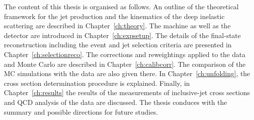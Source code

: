 The content of this thesis is organised as follows. An outline of the theoretical framework for the jet production and the kinematics of the deep inelastic scattering are described in Chapter~\ref{ch:theory}. The \hera machine as well as the \zeus detector are introduced in Chapter~\ref{ch:expsetup}. The details of the final-state reconstruction including the event and jet selection criteria are presented in Chapter~\ref{ch:selectionreco}. The corrections and reweightings applied to the data and Monte Carlo are described in Chapter~\ref{ch:calibcorr}. The comparison of the MC simulations with the data are also given there. In Chapter~\ref{ch:unfolding}, the cross section determination procedure is explained. Finally, in Chapter~\ref{ch:results} the results of the measurements of inclusive-jet cross sections and QCD analysis of the data are discussed. The thesis conduces with the summary and possible directions for future studies.